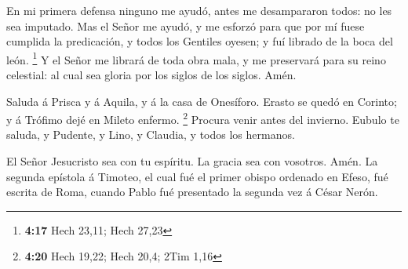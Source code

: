  En mi primera defensa ninguno me ayudó, antes me
desampararon todos: no les sea imputado.  Mas el Señor me
ayudó, y me esforzó para que por mí fuese cumplida la predicación, y
todos los Gentiles oyesen; y fuí librado de la boca del león.
\footnote{\textbf{4:17} Hech 23,11; Hech 27,23}  Y el
Señor me librará de toda obra mala, y me preservará para su reino
celestial: al cual sea gloria por los siglos de los siglos. Amén.

 Saluda á Prisca y á Aquila, y á la casa de Onesíforo.
 Erasto se quedó en Corinto; y á Trófimo dejé en Mileto
enfermo. \footnote{\textbf{4:20} Hech 19,22; Hech 20,4; 2Tim 1,16}
 Procura venir antes del invierno. Eubulo te saluda, y
Pudente, y Lino, y Claudia, y todos los hermanos.

 El Señor Jesucristo sea con tu espíritu. La gracia sea
con vosotros. Amén. La segunda epístola á Timoteo, el cual fué el primer
obispo ordenado en Efeso, fué escrita de Roma, cuando Pablo fué
presentado la segunda vez á César Nerón.
